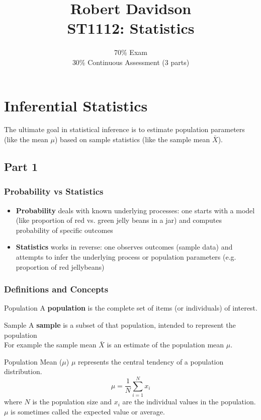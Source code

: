 \documentclass[9pt]{extarticle}
\title{
Robert Davidson \\
\textbf{ST1112: Statistics}
}
\author{
70\% Exam\\
30\% Continuous Assessment (3 parts)
}
\date{}       %
\begin{document}
\maketitle
\pagebreak

\tableofcontents
\pagebreak

\section{Inferential Statistics}
The ultimate goal in statistical inference is to estimate population parameters (like the mean $\mu$) based on sample statistics (like the sample mean $\bar{X}$).
\subsection{Part 1}
\subsubsection{Probability vs Statistics}
\begin{itemize}
    \item \textbf{Probability} deals with known underlying processes: one starts with a model (like proportion of red vs. green jelly beans in a jar) and computes probability of specific outcomes 
    \item \textbf{Statistics} works in reverse: one observes outcomes (sample data) and attempts to infer the underlying process or population parameters (e.g. proportion of red jellybeans)
\end{itemize}
\subsubsection{Definitions and Concepts}

\begin{definitionbox}{Population}{}
    A \textbf{population} is the complete set of items (or individuals) of interest.
\end{definitionbox}

\begin{definitionbox}{Sample}{}
    A \textbf{sample} is a subset of that population, intended to represent the population\\
    
    For example the sample mean $\bar{X}$ is an estimate of the population mean $\mu$.
\end{definitionbox}

\begin{definitionbox}{Population Mean ($\mu$)}{}
    $\mu$ represents the central tendency of a population distribution.
    $$\mu = \frac{1}{N} \sum_{i=1}^{N} x_i$$
    where $N$ is the population size and $x_i$ are the individual values in the population.\\

    $\mu$ is sometimes called the expected value or average.
\end{definitionbox}
\end{document}
